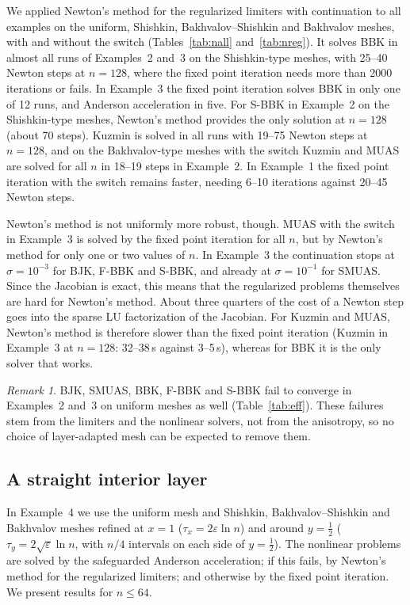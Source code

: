 \documentclass[11pt,a4paper]{article}
\newcommand{\eps}{\varepsilon}
\theoremstyle{remark}
\newtheorem{remark}{Remark}[section]
\begin{document}



We applied Newton's method for the regularized limiters with continuation to all examples on the uniform, Shishkin,
Bakhvalov--Shishkin and Bakhvalov meshes, with and without the switch (Tables~\ref{tab:nall} and~\ref{tab:nreg}).
It solves BBK in almost all runs of Examples~2 and~3 on the Shishkin-type meshes, with 25--40 Newton steps at
$n=128$, where the fixed point iteration needs more than 2000 iterations or fails. In Example~3 the fixed point
iteration solves BBK in only one of 12 runs, and Anderson acceleration in five. For S-BBK in Example~2 on the
Shishkin-type meshes, Newton's method provides the only solution at $n=128$ (about 70 steps). Kuzmin is solved in
all runs with 19--75 Newton steps at $n=128$, and on the Bakhvalov-type meshes with the switch Kuzmin and MUAS are
solved for all $n$ in 18--19 steps in Example~2. In Example~1 the fixed point iteration with the switch remains
faster, needing 6--10 iterations against 20--45 Newton steps.

Newton's method is not uniformly more robust, though. MUAS with the switch in Example~3 is solved by the fixed point
iteration for all $n$, but by Newton's method for only one or two values of $n$. In Example~3 the continuation stops
at $\sigma=10^{-3}$ for BJK, F-BBK and S-BBK, and already at $\sigma=10^{-1}$ for SMUAS. Since the Jacobian is exact,
this means that the regularized problems themselves are hard for Newton's method. About three quarters of the cost of
a Newton step goes into the sparse LU factorization of the Jacobian. For Kuzmin and MUAS, Newton's method is
therefore slower than the fixed point iteration (Kuzmin in Example~3 at $n=128$: 32--38\,s against 3--5\,s), whereas
for BBK it is the only solver that works.

\begin{remark}
BJK, SMUAS, BBK, F-BBK and S-BBK fail to converge in Examples~2 and~3 on uniform meshes as well (Table~\ref{tab:eff}).
These failures stem from the limiters and the nonlinear solvers, not from the anisotropy, so no choice of
layer-adapted mesh can be expected to remove them.
\end{remark}

\subsection{A straight interior layer}

In Example~4 we use the uniform mesh and Shishkin, Bakhvalov--Shishkin and Bakhvalov meshes refined at $x=1$
($\tau_x=2\eps\ln n$) and around $y=\frac12$ ($\tau_y=2\sqrt\eps\ln n$, with $n/4$ intervals on each side of
$y=\frac12$). The nonlinear problems are solved by the safeguarded Anderson acceleration; if this fails, by Newton's
method for the regularized limiters; and otherwise by the fixed point iteration. We present results for $n\le64$.
\end{document}
